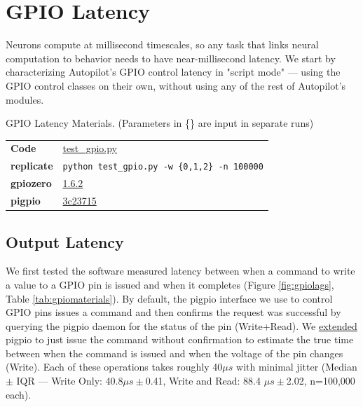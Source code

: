 \section{GPIO Latency}
\label{sec:gpiolatency}

Neurons compute at millisecond timescales, so any task that links neural computation to behavior needs to have near-millisecond latency. We start by characterizing Autopilot's GPIO control latency in "script mode" --- using the GPIO control classes on their own, without using any of the rest of Autopilot's modules.

\begin{margintable}[0cm]
\caption{GPIO Latency Materials. (Parameters in \{\} are input in separate runs)}
\label{tab:gpiomaterials}
\noindent\begin{tabularx}{\linewidth}{lX}%
\toprule
\textbf{Code} & \href{https://github.com/auto-pi-lot/plugin-paper/blob/main/plugin_paper/scripts/test_gpio.py}{test\_gpio.py} \\
\textbf{replicate} & \texttt{python test\_gpio.py -w \{0,1,2\} -n 100000}\\
\textbf{gpiozero} & \href{https://github.com/auto-pi-lot/plugin-paper/blob/main/plugin_paper/hardware/zero.py}{1.6.2} \\
\textbf{pigpio} & \href{https://github.com/sneakers-the-rat/pigpio/commit/3c237159e5995ec58cd673579bdd66a8d819b269}{3c23715} \\
\bottomrule
\end{tabularx}
\end{margintable}

\subsection{Output Latency}

We first tested the software measured latency between when a command to write a value to a GPIO pin is issued and when it completes (Figure \ref{fig:gpiolags}, Table \ref{tab:gpiomaterials}). By default, the pigpio interface we use to control GPIO pins issues a command and then confirms the request was successful by querying the pigpio daemon for the status of the pin (Write+Read). We \href{https://github.com/sneakers-the-rat/pigpio/commit/0782de06f0a5c092063118733ad2df9d65f1f1a0}{extended} pigpio to just issue the command without confirmation to estimate the true time between when the command is issued and when the voltage of the pin changes (Write). Each of these operations takes roughly 40$\mu s$ with minimal jitter (Median $\pm$ IQR --- Write Only: 40.8$\mu s \pm$0.41, Write and Read: 88.4 $\mu s \pm$2.02, n=100,000 each).


